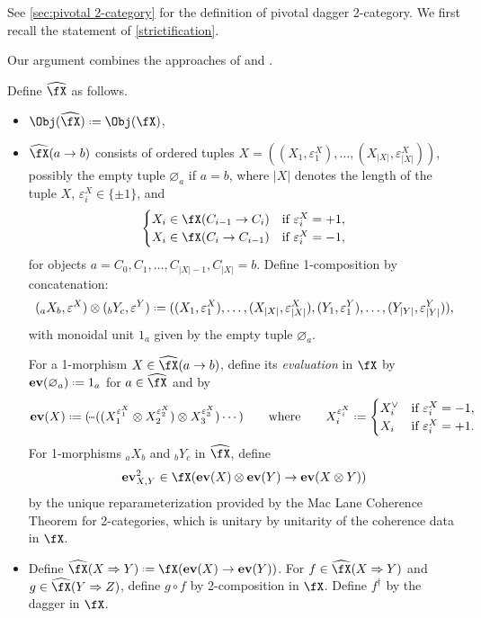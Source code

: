 \documentclass[12pt,reqno]{amsart}
\newcommand{\defn}[1]{\emph{#1}}
\DeclareRobustCommand{\coloneq}{\mathrel{\vcenter{\baselineskip0.5ex\lineskiplimit0pt\hbox{\scriptsize{\upshape.}}\hbox{\scriptsize{\upshape.}}}}=}
\begin{document}
See \cref{sec:pivotal 2-category} for the definition of pivotal dagger 2-category. We first recall the statement of \cref{strictification}.

\strictification*

Our argument combines the approaches of \cite[Appendix B]{Fer24} and \cite[\S2]{NS07}. 

\begin{pf} 
Define $\widehat{\fX}$ as follows.
\begin{itemize} 
\item $\Obj(\widehat{\fX})\coloneq\Obj(\fX)$,
\item $\widehat{\fX}(a\to b)$ consists of ordered tuples $X=((X_1,\varepsilon^X_1),\dots,(X_{|X|},\varepsilon^X_{|X|}))$, possibly the empty tuple $\varnothing_{a}$ if $a=b$, where $|X|$ denotes the length of the tuple $X$, $\varepsilon^X_i\in\{\pm 1\}$, and
\[
\begin{cases}X_i\in\fX(C_{i-1}\to C_i)&\text{if }\varepsilon^X_i=+1,\\X_i\in\fX(C_i\to C_{i-1})&\text{if }\varepsilon^X_i=-1,\end{cases}
\]
for objects $a=C_0,C_1,\ldots,C_{|X|-1},C_{|X|}= b$. Define 1-composition by concatenation:
\[
({}_aX_b,\varepsilon^X)\otimes({}_bY_c,\varepsilon^Y)\coloneq((X_1,\varepsilon^X_1),\ldots,(X_{|X|},\varepsilon^X_{|X|}),(Y_1,\varepsilon^Y_1),\ldots,(Y_{|Y|},\varepsilon^Y_{|Y|})),
\]
with monoidal unit $1_a$ given by the empty tuple $\varnothing_a$.

For a 1-morphism $X\in\widehat{\fX}(a\to b)$, define its \defn{evaluation} in $\fX$ by $\mathbf{ev}(\varnothing_a)\coloneq 1_a$ for $a\in\widehat{\fX}$ and by
\[
\mathbf{ev}(X)\coloneq(\!\cdot\!\!\cdot\!\!\cdot((X^{\varepsilon^X_1}_1\otimes X^{\varepsilon^X_2}_2)\otimes X^{\varepsilon^X_3}_3)\cdots)\qquad\text{where}\qquad
X_i^{\varepsilon^X_i}
\coloneq 
\begin{cases}
X_i^{\vee}&\text{if }\varepsilon^X_i=-1,\\
X_i&\text{if }\varepsilon^X_i=+1.
\end{cases}
\]
For 1-morphisms ${}_aX_b$ and ${}_bY_c$ in $\widehat{\fX}$, define
\[
\mathbf{ev}^2_{X,Y}\in\fX(\mathbf{ev}(X)\otimes\mathbf{ev}(Y)\to\mathbf{ev}(X\otimes Y))
\]
by the unique reparameterization provided by the Mac Lane Coherence Theorem for 2-categories, which is unitary by unitarity of the coherence data in $\fX$.

\item Define $\widehat{\fX}(X\Rightarrow Y)\coloneq\fX(\mathbf{ev}(X)\to\mathbf{ev}(Y))$. For $f\in\widehat{\fX}(X\Rightarrow Y)$ and $g\in\widehat{\fX}(Y\Rightarrow Z)$, define $g\circ f$ by 2-composition in $\fX$. Define $f^\dag$ by the dagger in $\fX$.


\end{itemize}
\end{pf}
\end{document}
